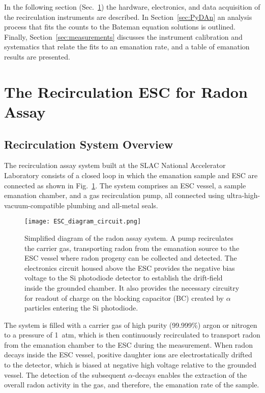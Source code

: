 \documentclass[final,3p,times]{elsarticle}
\begin{document}
In the following section (Sec.~\ref{sec:Overview}) the hardware, electronics, and data acquisition of the recirculation instruments are described. 
In Section~\ref{sec:PyDAn} an analysis process that fits the counts to the Bateman equation solutions is outlined.
Finally, Section~\ref{sec:measurements} discusses the instrument calibration and systematics that relate the fits to an emanation rate, and a table of emanation results are presented.


\section{The Recirculation ESC for Radon Assay}
\label{sec:Overview}
\subsection{Recirculation System Overview}
The recirculation assay system built at the SLAC National Accelerator Laboratory consists of a closed loop in which the emanation sample and ESC are connected as shown in Fig.~\ref{fig:esc_recir}. 
The system comprises an ESC vessel, a sample emanation chamber, and a gas recirculation pump, all connected using ultra-high-vacuum-compatible plumbing and all-metal seals. 
\begin{figure}
\centering
  \texttt{[image: ESC\_diagram\_circuit.png]}
  \caption{Simplified diagram of the radon assay system. A pump recirculates the carrier gas, transporting radon from the emanation source to the ESC vessel where radon progeny can be collected and detected. The electronics circuit housed above the ESC provides the negative bias voltage to the Si photodiode detector to establish the drift-field inside the grounded chamber. It also provides the necessary circuitry for readout of charge on the blocking capacitor (BC) created by $\alpha$ particles entering the Si photodiode.}
  \label{fig:esc_recir}
\end{figure}
The system is filled with a carrier gas of high purity (99.999\%) argon or nitrogen to a pressure of 1~atm, which is then continuously recirculated to transport radon from the emanation chamber to the ESC during the measurement. 
When radon decays inside the ESC vessel, positive daughter ions are electrostatically drifted to the detector, which is biased at negative high voltage relative to the grounded vessel. 
The detection of the subsequent $\alpha$-decays enables the extraction of the overall radon activity in the gas, and therefore, the emanation rate of the sample.
\end{document}

